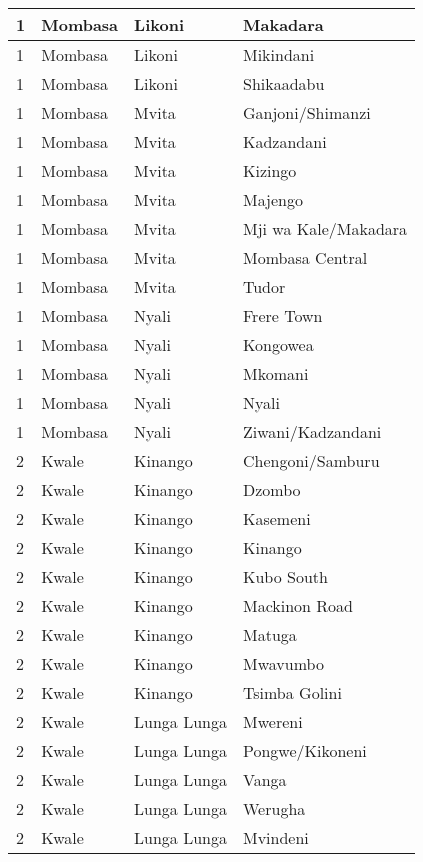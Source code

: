 \begin{table}[!ht]
\begin{tabular}{|l|l|l|l|}
        1 & Mombasa & Likoni & Makadara \\ \hline
        1 & Mombasa & Likoni & Mikindani \\ \hline
        1 & Mombasa & Likoni & Shikaadabu \\ \hline
        1 & Mombasa & Mvita & Ganjoni/Shimanzi \\ \hline
        1 & Mombasa & Mvita & Kadzandani \\ \hline
        1 & Mombasa & Mvita & Kizingo \\ \hline
        1 & Mombasa & Mvita & Majengo \\ \hline
        1 & Mombasa & Mvita & Mji wa Kale/Makadara \\ \hline
        1 & Mombasa & Mvita & Mombasa Central \\ \hline
        1 & Mombasa & Mvita & Tudor \\ \hline
        1 & Mombasa & Nyali & Frere Town \\ \hline
        1 & Mombasa & Nyali & Kongowea \\ \hline
        1 & Mombasa & Nyali & Mkomani \\ \hline
        1 & Mombasa & Nyali & Nyali \\ \hline
        1 & Mombasa & Nyali & Ziwani/Kadzandani \\ \hline
        2 & Kwale & Kinango & Chengoni/Samburu \\ \hline
        2 & Kwale & Kinango & Dzombo \\ \hline
        2 & Kwale & Kinango & Kasemeni \\ \hline
        2 & Kwale & Kinango & Kinango \\ \hline
        2 & Kwale & Kinango & Kubo South \\ \hline
        2 & Kwale & Kinango & Mackinon Road \\ \hline
        2 & Kwale & Kinango & Matuga \\ \hline
        2 & Kwale & Kinango & Mwavumbo \\ \hline
        2 & Kwale & Kinango & Tsimba Golini \\ \hline
        2 & Kwale & Lunga Lunga & Mwereni \\ \hline
        2 & Kwale & Lunga Lunga & Pongwe/Kikoneni \\ \hline
        2 & Kwale & Lunga Lunga & Vanga \\ \hline
        2 & Kwale & Lunga Lunga & Werugha \\ \hline
        2 & Kwale & Lunga Lunga & Mvindeni \\ \hline

\end{tabular}
\end{table}
